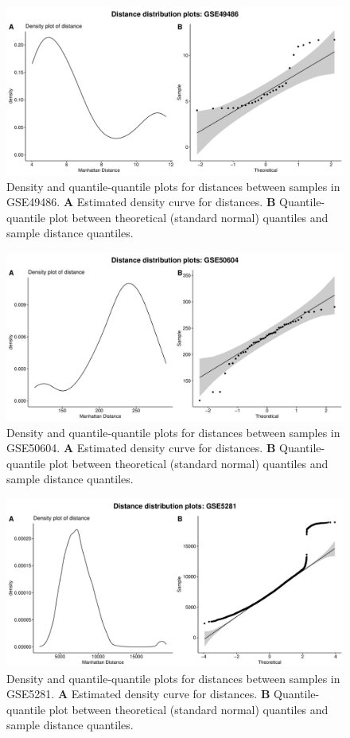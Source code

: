 \documentclass[10pt,letterpaper]{article}\usepackage[]{graphicx}\usepackage[]{color}
\begin{document}
\begin{figure}[H]
	\includegraphics[width=\textwidth]{manhattan-distance_hist_GSE49486.pdf}
	\caption{Density and quantile-quantile plots for distances between samples in GSE49486. \textbf{A} Estimated density curve for distances. \textbf{B} Quantile-quantile plot between theoretical (standard normal) quantiles and sample distance quantiles.}
\end{figure}

\begin{figure}[H]
	\includegraphics[width=\textwidth]{manhattan-distance_hist_GSE50604.pdf}
	\caption{Density and quantile-quantile plots for distances between samples in GSE50604. \textbf{A} Estimated density curve for distances. \textbf{B} Quantile-quantile plot between theoretical (standard normal) quantiles and sample distance quantiles.}
\end{figure}

\begin{figure}[H]
	\includegraphics[width=\textwidth]{manhattan-distance_hist_GSE5281.pdf}
	\caption{Density and quantile-quantile plots for distances between samples in GSE5281. \textbf{A} Estimated density curve for distances. \textbf{B} Quantile-quantile plot between theoretical (standard normal) quantiles and sample distance quantiles.}
\end{figure}
\end{document}
